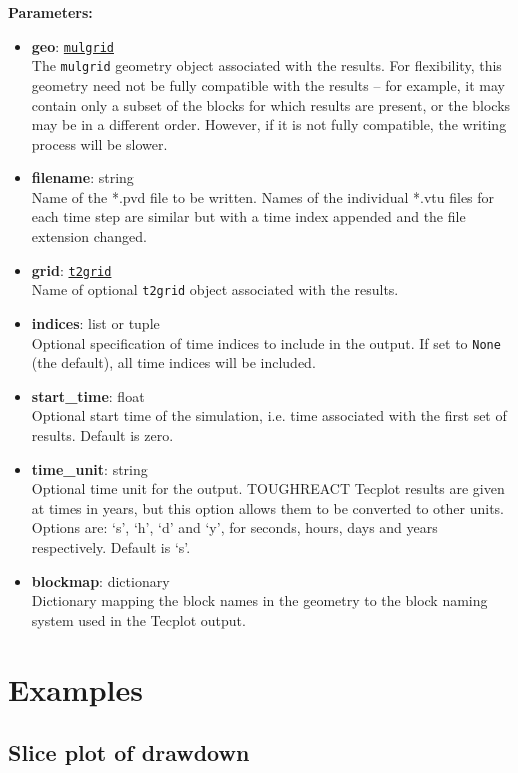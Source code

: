 \textbf{Parameters:}
\begin{itemize}
\item \textbf{geo}: \hyperref[mulgrids]{\texttt{mulgrid}}\\
  The \texttt{mulgrid} geometry object associated with the results.  For flexibility, this geometry need not be fully compatible with the results -- for example, it may contain only a subset of the blocks for which results are present, or the blocks may be in a different order.  However, if it is not fully compatible, the writing process will be slower.
\item \textbf{filename}: string\\
  Name of the *.pvd file to be written.  Names of the individual *.vtu files for each time step are similar but with a time index appended and the file extension changed.
\item \textbf{grid}: \hyperref[t2grids]{\texttt{t2grid}}\\
  Name of optional \texttt{t2grid} object associated with the results.
\item \textbf{indices}: list or tuple\\
  Optional specification of time indices to include in the output.  If set to \texttt{None} (the default), all time indices will be included.
\item \textbf{start\_time}: float\\
  Optional start time of the simulation, i.e. time associated with the first set of results.  Default is zero.
\item \textbf{time\_unit}: string\\
  Optional time unit for the output.  TOUGHREACT Tecplot results are given at times in years, but this option allows them to be converted to other units.  Options are: `s', `h', `d' and `y', for seconds, hours, days and years respectively.  Default is `s'.
\item \textbf{blockmap}: dictionary\\
  Dictionary mapping the block names in the geometry to the block naming system used in the Tecplot output.
\end{itemize}

\section{Examples}

\subsection{Slice plot of drawdown}

